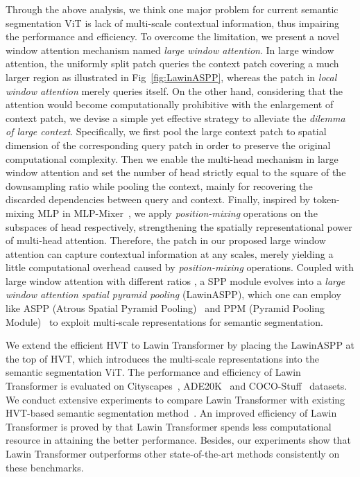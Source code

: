 \documentclass[10pt,twocolumn,letterpaper]{article}
\begin{document}
Through the above analysis, we think one major problem for current semantic segmentation ViT is lack of multi-scale contextual information, thus impairing the performance and efficiency. To overcome the limitation, we present a novel window attention mechanism named \textit{large window attention}. In large window attention, the uniformly split patch queries the context patch covering a much larger region as illustrated in Fig~\ref{fig:LawinASPP}, whereas the patch in \textit{local window attention} merely queries itself. On the other hand, considering that the attention would become computationally prohibitive with the enlargement of context patch, we devise a simple yet effective strategy to alleviate the \textit{dilemma of large context}. Specifically, we first pool the large context patch to spatial dimension of the corresponding query patch in order to preserve the original computational complexity. Then we enable the multi-head mechanism in large window attention and set the number of head strictly equal to the square of the downsampling ratio  while pooling the context, mainly for recovering the discarded dependencies between query and context. Finally, inspired by token-mixing MLP in MLP-Mixer~\cite{tolstikhin2021mlp}, we apply  \textit{position-mixing} operations on the  subspaces of head respectively, strengthening the spatially representational power of multi-head attention. Therefore, the patch in our proposed large window attention can capture contextual information at any scales, merely yielding a little computational overhead caused by \textit{position-mixing} operations. Coupled with large window attention with different ratios , a SPP module evolves into a \textit{large window attention spatial pyramid pooling} (LawinASPP), which one can employ like ASPP (Atrous Spatial Pyramid Pooling)~\cite{chen2017rethinking} and PPM (Pyramid Pooling Module)~\cite{zhao2017pyramid} to exploit multi-scale representations for semantic segmentation.

We extend the efficient HVT to Lawin Transformer by placing the LawinASPP at the top of HVT, which introduces the multi-scale representations into the semantic segmentation ViT. The performance and efficiency of Lawin Transformer is evaluated on Cityscapes~\cite{cordts2016cityscapes}, ADE20K~\cite{zhou2017scene} and COCO-Stuff~\cite{caesar2018coco} datasets. We conduct extensive experiments to compare Lawin Transformer with existing HVT-based semantic segmentation method~\cite{liu2021swin, xie2021segformer, cheng2021maskformer}. An improved efficiency of Lawin Transformer is proved by that Lawin Transformer spends less computational resource in attaining the better performance. Besides, our experiments show that Lawin Transformer outperforms other state-of-the-art methods consistently on these benchmarks. 
\end{document}
